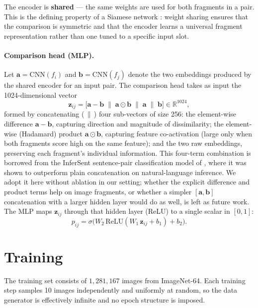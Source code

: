 \documentclass[12pt, a4paper]{article}
\begin{document}
The encoder is \textbf{shared} — the same weights are used for both fragments in a pair.
This is the defining property of a Siamese network \parencite{siamese1994}: weight
sharing ensures that the comparison is symmetric and that the encoder learns a universal
fragment representation rather than one tuned to a specific input slot.

\paragraph{Comparison head (MLP).}
Let $\mathbf{a} = \text{CNN}(f_i)$ and $\mathbf{b} = \text{CNN}(f_j)$ denote the two
embeddings produced by the shared encoder for an input pair. The comparison head
takes as input the 1024-dimensional vector
\[
\mathbf{z}_{ij} = \bigl[\mathbf{a} - \mathbf{b} \;\|\; \mathbf{a} \odot \mathbf{b} \;\|\; \mathbf{a} \;\|\; \mathbf{b}\bigr] \in \mathbb{R}^{1024},
\]
formed by concatenating ($\,\|\,$) four sub-vectors of size 256: the element-wise
difference $\mathbf{a} - \mathbf{b}$, capturing direction and magnitude of
dissimilarity; the element-wise (Hadamard) product $\mathbf{a} \odot \mathbf{b}$,
capturing feature co-activation (large only when both fragments score high on the
same feature); and the two raw embeddings, preserving each fragment's individual
information. This four-term combination is borrowed from the InferSent sentence-pair
classification model of \textcite{infersent2017}, where it was shown to outperform
plain concatenation on natural-language inference. We adopt it here without
ablation in our setting; whether the explicit difference and product terms help
on image fragments, or whether a simpler $[\mathbf{a}, \mathbf{b}]$
concatenation with a larger hidden layer would do as well, is left as future
work. The MLP maps
$\mathbf{z}_{ij}$ through that hidden layer (ReLU) to a single scalar in
$[0, 1]$:
\[
p_{ij} = \sigma\!\bigl(W_2\,\text{ReLU}(W_1\,\mathbf{z}_{ij} + b_1) + b_2\bigr).
\]

\section{Training}

The training set consists of $1{,}281{,}167$ images from ImageNet-64. Each
training step samples 10 images independently and uniformly at random,
so the data generator is effectively infinite and no epoch structure is
imposed.
\end{document}
